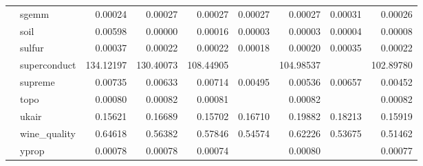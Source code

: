 \begin{tabular}{llrrrrrrr}
 & sgemm & 0.00024 & 0.00027 & 0.00027 & 0.00027 & 0.00027 & 0.00031 & 0.00026 \\
 & soil & 0.00598 & 0.00000 & 0.00016 & 0.00003 & 0.00003 & 0.00004 & 0.00008 \\
 & sulfur & 0.00037 & 0.00022 & 0.00022 & 0.00018 & 0.00020 & 0.00035 & 0.00022 \\
 & superconduct & 134.12197 & 130.40073 & 108.44905 &  & 104.98537 &  & 102.89780 \\
 & supreme & 0.00735 & 0.00633 & 0.00714 & 0.00495 & 0.00536 & 0.00657 & 0.00452 \\
 & topo & 0.00080 & 0.00082 & 0.00081 &  & 0.00082 &  & 0.00082 \\
 & ukair & 0.15621 & 0.16689 & 0.15702 & 0.16710 & 0.19882 & 0.18213 & 0.15919 \\
 & wine_quality & 0.64618 & 0.56382 & 0.57846 & 0.54574 & 0.62226 & 0.53675 & 0.51462 \\
 & yprop & 0.00078 & 0.00078 & 0.00074 &  & 0.00080 &  & 0.00077 \\
\bottomrule
\end{tabular}
